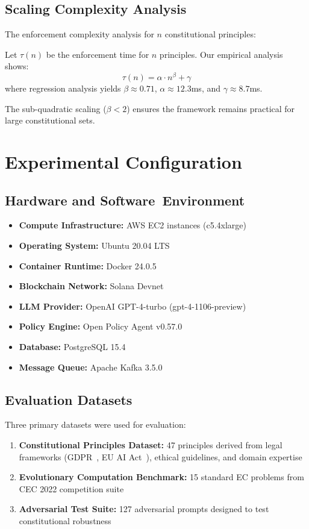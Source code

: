 \documentclass[10pt,twocolumn]{article}
\theoremstyle{definition}
\begin{document}
\subsection{Scaling Complexity Analysis}
The enforcement complexity analysis for $n$ constitutional principles:

Let $\tau(n)$ be the enforcement time for $n$ principles. Our empirical analysis shows:
$$\tau(n) = \alpha \cdot n^{\beta} + \gamma$$
where regression analysis yields $\beta \approx 0.71$, $\alpha \approx 12.3$ms, and $\gamma \approx 8.7$ms.

The sub-quadratic scaling ($\beta < 2$) ensures the framework remains practical for large constitutional sets.

\section{Experimental Configuration}
\label{sec:appendix_experimental}

\subsection{Hardware and Software~Environment}
\begin{itemize}[leftmargin=*,topsep=2pt,itemsep=2pt,parsep=0pt]
    \item \textbf{Compute Infrastructure:} AWS EC2 instances (c5.4xlarge)
    \item \textbf{Operating System:} Ubuntu 20.04 LTS
    \item \textbf{Container Runtime:} Docker 24.0.5
    \item \textbf{Blockchain Network:} Solana Devnet
    \item \textbf{LLM Provider:} OpenAI GPT-4-turbo (gpt-4-1106-preview)
    \item \textbf{Policy Engine:} Open Policy Agent v0.57.0
    \item \textbf{Database:} PostgreSQL 15.4
    \item \textbf{Message Queue:} Apache Kafka 3.5.0
\end{itemize}

\subsection{Evaluation Datasets}
Three primary datasets were used for evaluation:

\begin{enumerate}
    \item \textbf{Constitutional Principles Dataset:} 47 principles derived from legal frameworks (GDPR~\cite{gdpr2016}, EU AI Act~\cite{eu2024ai}), ethical guidelines, and domain expertise
    \item \textbf{Evolutionary Computation Benchmark:} 15 standard EC problems from CEC 2022 competition suite
    \item \textbf{Adversarial Test Suite:} 127 adversarial prompts designed to test constitutional robustness
\end{enumerate}
\end{document}

